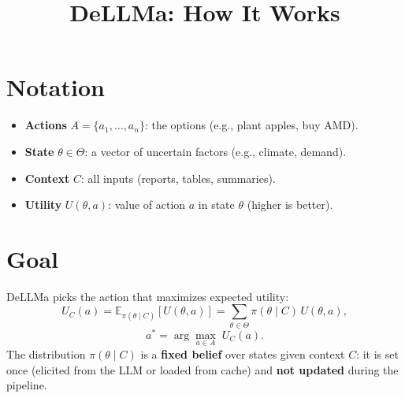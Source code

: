 \documentclass[11pt]{article}
\title{DeLLMa: How It Works}
\author{}
\date{}
\begin{document}
\maketitle

\begin{center}
\end{center}
\vspace{1em}

\section{Notation}

\begin{itemize}[leftmargin=*]
\item \textbf{Actions} $A = \{a_1,\ldots,a_n\}$: the options (e.g., plant apples, buy AMD).
\item \textbf{State} $\theta \in \Theta$: a vector of uncertain factors (e.g., climate, demand).
\item \textbf{Context} $C$: all inputs (reports, tables, summaries).
\item \textbf{Utility} $U(\theta,a)$: value of action $a$ in state $\theta$ (higher is better).
\end{itemize}

\section{Goal}

DeLLMa picks the action that maximizes expected utility:
\begin{equation}\label{eq:EUC}
U_C(a) = \mathbb{E}_{\pi(\theta\mid C)}[U(\theta,a)] = \sum_{\theta \in \Theta} \pi(\theta\mid C)\, U(\theta,a),
\end{equation}
\begin{equation}\label{eq:objective}
a^* = \arg\max_{a \in A} \; U_C(a).
\end{equation}
The distribution $\pi(\theta\mid C)$ is a \textbf{fixed belief} over states given context $C$: it is set once (elicited from the LLM or loaded from cache) and \textbf{not updated} during the pipeline.
\end{document}
